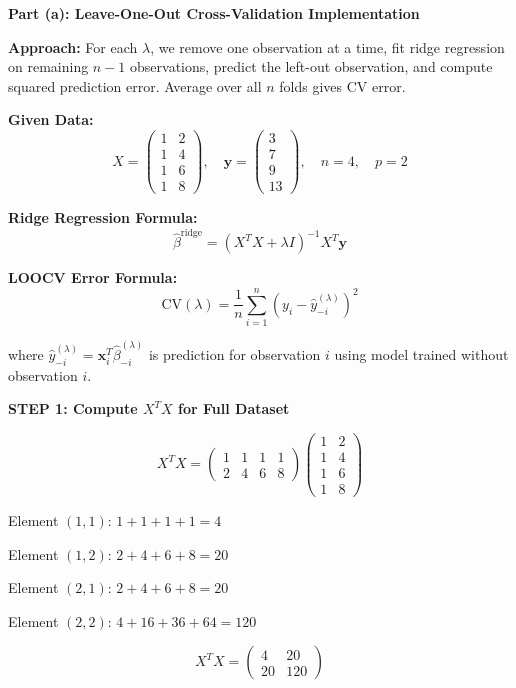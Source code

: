 \documentclass[12pt]{article}
\begin{document}
\begin{solution}

\textbf{Part (a): Leave-One-Out Cross-Validation Implementation}

\textbf{Approach:} For each $\lambda$, we remove one observation at a time, fit ridge regression on remaining $n-1$ observations, predict the left-out observation, and compute squared prediction error. Average over all $n$ folds gives CV error.

\textbf{Given Data:}
\[X = \begin{pmatrix} 1 & 2 \\ 1 & 4 \\ 1 & 6 \\ 1 & 8 \end{pmatrix}, \quad \mathbf{y} = \begin{pmatrix} 3 \\ 7 \\ 9 \\ 13 \end{pmatrix}, \quad n = 4, \quad p = 2\]

\textbf{Ridge Regression Formula:}
\[\hat{\beta}^{\text{ridge}} = (X^TX + \lambda I)^{-1}X^T\mathbf{y}\]

\textbf{LOOCV Error Formula:}
\[\text{CV}(\lambda) = \frac{1}{n}\sum_{i=1}^{n}(y_i - \hat{y}_{-i}^{(\lambda)})^2\]

where $\hat{y}_{-i}^{(\lambda)} = \mathbf{x}_i^T\hat{\beta}_{-i}^{(\lambda)}$ is prediction for observation $i$ using model trained without observation $i$.

\textbf{STEP 1: Compute $X^TX$ for Full Dataset}

\[X^TX = \begin{pmatrix} 1 & 1 & 1 & 1 \\ 2 & 4 & 6 & 8 \end{pmatrix} \begin{pmatrix} 1 & 2 \\ 1 & 4 \\ 1 & 6 \\ 1 & 8 \end{pmatrix}\]

Element $(1,1)$: $1 + 1 + 1 + 1 = 4$

Element $(1,2)$: $2 + 4 + 6 + 8 = 20$

Element $(2,1)$: $2 + 4 + 6 + 8 = 20$

Element $(2,2)$: $4 + 16 + 36 + 64 = 120$

\[X^TX = \begin{pmatrix} 4 & 20 \\ 20 & 120 \end{pmatrix}\]


\end{solution}
\end{document}
